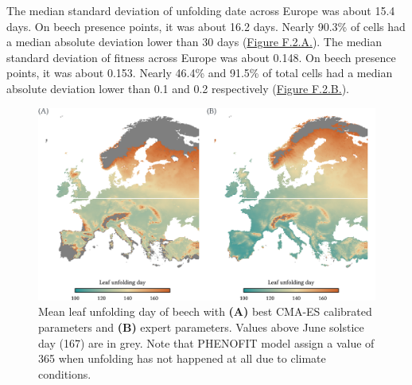 The median standard deviation of unfolding date across Europe was about
15.4 days. On beech presence points, it was about 16.2 days. Nearly
90.3\% of cells had a median absolute deviation lower than 30 days
(\hyperref[fig:consensusfitnessmap]{Figure F.2.A.}). The median standard
deviation of fitness across Europe was about 0.148. On beech presence
points, it was about 0.153. Nearly 46.4\% and 91.5\% of total cells had
a median absolute deviation lower than 0.1 and 0.2 respectively
(\hyperref[fig:consensusfitnessmap]{Figure F.2.B.}).

\begin{figure}[h]
\centering 
\includegraphics{chapter1/figs/supp/unfoldingdatesbackforw} 
\caption{Mean leaf unfolding day of beech with \textbf{(A)} best CMA-ES calibrated parameters and \textbf{(B)} expert parameters. Values above June solstice day (167) are in grey. Note that PHENOFIT model assign a value of 365 when unfolding has not happened at all due to climate conditions.}\label{fig:unfoldingdatesbackforw}
\end{figure}